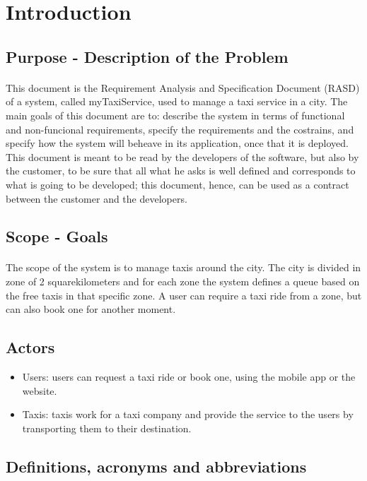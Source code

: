 \section{Introduction}
	\subsection{Purpose - Description of the Problem}
	\paragraph*{}This document is the Requirement Analysis and Specification Document (RASD) of a system, called myTaxiService, used to manage a taxi service in a city. The main goals of this document are to: describe the system in terms of functional and non-funcional requirements, specify the requirements and the costrains, and specify how the system will beheave in its application, once that it is deployed. This document is meant to be read by the developers of the software, but also by the customer, to be sure that all what he asks is well defined and corresponds to what is going to be developed; this document, hence, can be used as a contract between the customer and the developers.
		
	\subsection{Scope - Goals}
	\paragraph*{}The scope of the system is to manage taxis around the city. The city is divided in zone of 2 squarekilometers and for each zone the system defines a queue based on the free taxis in that specific zone. A user can require a taxi ride from a zone, but can also book one for another moment.
	
	\subsection{Actors}
	\begin{itemize}
		\item Users: users can request a taxi ride or book one, using the mobile app or the website.
		\item Taxis: taxis work for a taxi company and provide the service to the users by transporting them to their destination.
	\end{itemize}
	\subsection{Definitions, acronyms and abbreviations}
